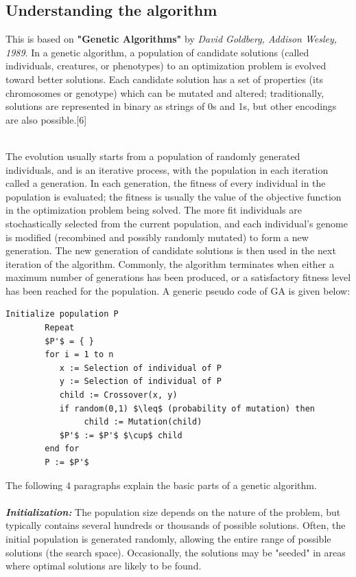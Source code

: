 \documentclass[a4paper, 12pt]{article}
\begin{document}
\subsection{Understanding the algorithm}
This is based on \textbf{"Genetic Algorithms"} by \textit{David Goldberg, Addison Wesley, 1989}. In a genetic algorithm, a population of candidate solutions (called individuals, creatures, or phenotypes) to an optimization problem is evolved toward better solutions. Each candidate solution has a set of properties (its chromosomes or genotype) which can be mutated and altered; traditionally, solutions are represented in binary as strings of 0s and 1s, but other encodings are also possible.[6]\par
\noindent
\\The evolution usually starts from a population of randomly generated individuals, and is an iterative process, with the population in each iteration called a generation. In each generation, the fitness of every individual in the population is evaluated; the fitness is usually the value of the objective function in the optimization problem being solved. The more fit individuals are stochastically selected from the current population, and each individual's genome is modified (recombined and possibly randomly mutated) to form a new generation. The new generation of candidate solutions is then used in the next iteration of the algorithm. Commonly, the algorithm terminates when either a maximum number of generations has been produced, or a satisfactory fitness level has been reached for the population.
 A generic pseudo code of GA is given below:
\begin{lstlisting}[mathescape]
        Initialize population P
        Repeat
        $P'$ = { }
        for i = 1 to n
           x := Selection of individual of P
           y := Selection of individual of P
           child := Crossover(x, y)
           if random(0,1) $\leq$ (probability of mutation) then
                child := Mutation(child)
           $P'$ := $P'$ $\cup$ child
        end for
        P := $P'$
\end{lstlisting}
The following 4 paragraphs explain the basic parts of a genetic algorithm.\\~\\
\textbf{\textit{Initialization:}}
The population size depends on the nature of the problem, but typically contains several hundreds or thousands of possible solutions. Often, the initial population is generated randomly, allowing the entire range of possible solutions (the search space). Occasionally, the solutions may be "seeded" in areas where optimal solutions are likely to be found.\\~\\
\end{document}
